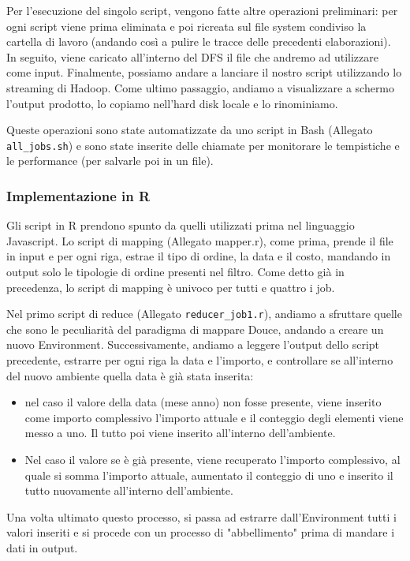 Per l'esecuzione del singolo script, vengono fatte altre operazioni preliminari: per ogni script viene prima eliminata e poi ricreata sul file system condiviso la cartella di lavoro (andando così a pulire le tracce delle precedenti elaborazioni). In seguito, viene caricato all'interno del DFS il file che andremo ad utilizzare come input. Finalmente, possiamo andare a lanciare il nostro script utilizzando lo streaming di Hadoop. Come ultimo passaggio, andiamo a visualizzare a schermo l'output prodotto, lo copiamo nell'hard disk locale e lo rinominiamo.

Queste operazioni sono state automatizzate da uno script in Bash (Allegato \texttt{all\_jobs.sh}) e sono state inserite delle chiamate per monitorare le tempistiche e le performance (per salvarle poi in un file).
\subsubsection{Implementazione in R}
Gli script in R prendono spunto da quelli utilizzati prima nel linguaggio Javascript. Lo script di mapping (Allegato mapper.r), come prima, prende il file in input e per ogni riga, estrae il tipo di ordine, la data e il costo, mandando in output solo le tipologie di ordine presenti nel filtro. Come detto già in precedenza, lo script di mapping è univoco per tutti e quattro i job.

Nel primo script di reduce (Allegato \texttt{reducer\_job1.r}), andiamo a sfruttare quelle che sono le peculiarità del paradigma di mappare Douce, andando a creare un nuovo Environment. Successivamente, andiamo a leggere l'output dello script precedente, estrarre per ogni riga la data e l'importo, e controllare se all'interno del nuovo ambiente quella data è già stata inserita:
\begin{itemize}
    \item nel caso il valore della data (mese anno) non fosse presente, viene inserito come importo complessivo l'importo attuale e il conteggio degli elementi viene messo a uno. Il tutto poi viene inserito all'interno dell'ambiente.
    \item Nel caso il valore se è già presente, viene recuperato l'importo complessivo, al quale si somma l'importo attuale, aumentato il conteggio di uno e inserito il tutto nuovamente all'interno dell'ambiente.
\end{itemize}
Una volta ultimato questo processo, si passa ad estrarre dall'Environment tutti i valori inseriti e si procede con un processo di "abbellimento" prima di mandare i dati in output.


